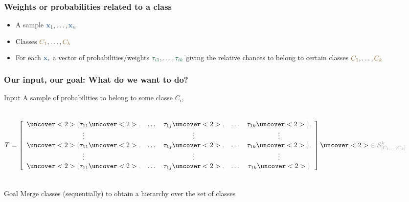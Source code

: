 \begin{frame}[t]
\frametitle{Weights or probabilities related to a class}

\begin{itemize}
\item A sample $\obs{\textbf{x}_1}, \dots, \obs{\textbf{x}_n}$
\item Classes $\class{C_1}, \dots, \class{C_k}$
\item<3-> For each $\obs{\textbf{x}_i}$ a vector of probabilities/weights $\post{\tau_{i1}}, \dots, \post{\tau_{ik}}$ giving the relative chances to belong to certain classes $\class{C_1}, \dots, \class{C_k}$
\end{itemize}

\bigskip
\begin{center}

\end{center}
\end{frame}

\begin{frame}[t]
\frametitle{Our input, our goal: What do we want to do?}

\begin{block}{Input}
A sample of probabilities to belong to some classe $C_i$, 
\begin{columns}
\[ T = \left[ \begin{array}{ccccc}
\idea{(}\tau_{11}\idea{,} & \dots & \tau_{1j}\idea{,} & \dots & \tau_{1k}\idea{),} \\
\vdots      & &    \vdots                     & &    \vdots                     \\
\idea{(}\tau_{11}\idea{,} & \dots & \tau_{1j}\idea{,} & \dots & \tau_{1k}\idea{),} \\
\vdots      & &      \vdots                   & &       \vdots                  \\
\idea{(}\tau_{11}\idea{,} & \dots & \tau_{1j}\idea{,} & \dots & \tau_{1k}\idea{)}
\end{array} \right] 
\idea{ \in \mathcal{S}_{[C_1,\dots,C_k]}^k } \]
\end{columns}
\end{block}

\pause
\begin{alertblock}{Goal}
\alert{Merge} classes (sequentially) to obtain a hierarchy over the set of classes %
\end{alertblock}
\end{frame}




